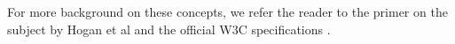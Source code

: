 For more background on these concepts, we refer the reader to the primer on the subject by Hogan et al \cite{Hogan2021KG} and the official W3C specifications \cite{rdf, rdfs, owl, turtle, sparql, xsd}.





